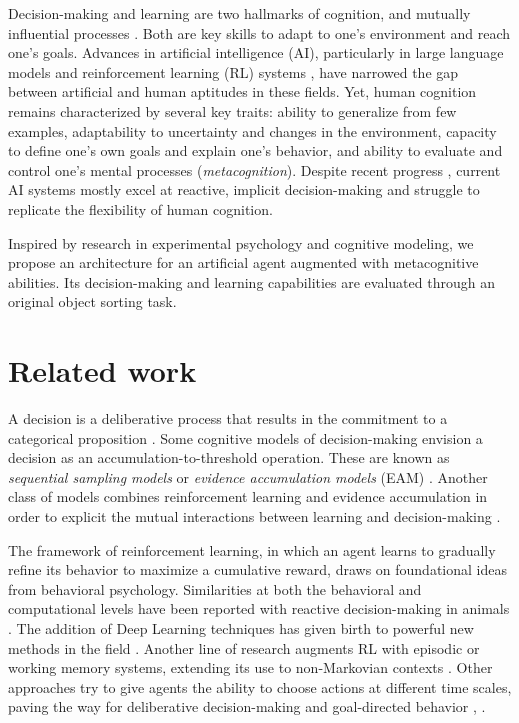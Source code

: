 \documentclass[runningheads]{llncs}
\begin{document}
Decision-making and learning are two hallmarks of cognition, and mutually influential processes \cite{mileticNewModelDecision2021}. Both are key skills to adapt to one's environment and reach one's goals. Advances in artificial intelligence (AI), particularly in large language models \cite{radfordImprovingLanguageUnderstanding} and reinforcement learning (RL) systems \cite{suttonReinforcementLearningIntroduction2018}, have narrowed the gap between artificial and human aptitudes in these fields. Yet, human cognition remains characterized by several key traits: ability to generalize from few examples, adaptability to uncertainty and changes in the environment, capacity to define one's own goals and explain one's behavior, and ability to evaluate and control one's mental processes (\textit{metacognition}). Despite recent progress \cite{weiChainofThoughtPromptingElicits2023} \cite{botvinickReinforcementLearningFast2019}, current AI systems mostly excel at reactive, implicit decision-making and struggle to replicate the flexibility of human cognition.

Inspired by research in experimental psychology and cognitive modeling, we propose an architecture for an artificial agent augmented with metacognitive abilities. Its decision-making and learning capabilities are evaluated through an original object sorting task.

\section{Related work}

A decision is a deliberative process that results in the commitment to a categorical proposition \cite{goldNeuralBasisDecision2007}. Some cognitive models of decision-making envision a decision as an accumulation-to-threshold operation. These are known as \textit{sequential sampling models} or \textit{evidence accumulation models} (EAM) \cite{forstmannSequentialSamplingModels2016}. Another class of models combines reinforcement learning and evidence accumulation in order to explicit the mutual interactions between learning and decision-making \cite{mileticNewModelDecision2021}.

The framework of reinforcement learning, in which an agent learns to gradually refine its behavior to maximize a cumulative reward, draws on foundational ideas from behavioral psychology. Similarities at both the behavioral and computational levels have been reported with reactive decision-making in animals \cite{suriNeuralNetworkModel1999}. The addition of Deep Learning techniques has given birth to powerful new methods in the field \cite{mnihHumanlevelControlDeep2015}. Another line of research augments RL with episodic or working memory systems, extending its use to non-Markovian contexts \cite{zilliModelingRoleWorking2008}. Other approaches try to give agents the ability to choose actions at different time scales, paving the way for deliberative decision-making and goal-directed behavior \cite{stolleLearningOptionsReinforcement2002}, \cite{baconOptionCriticArchitecture2016}.
\end{document}

